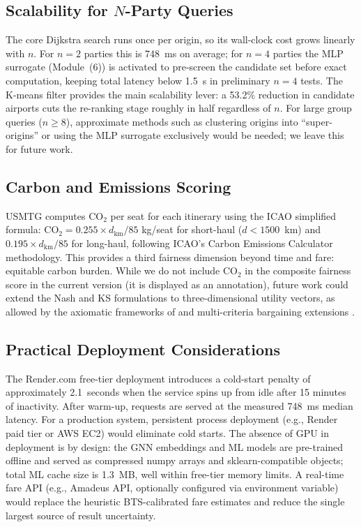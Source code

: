 \documentclass[review]{elsarticle}
\begin{document}
\subsection{Scalability for $N$-Party Queries}

The core Dijkstra search runs once per origin, so its wall-clock cost grows linearly with $n$.
For $n=2$ parties this is 748~ms on average; for $n=4$ parties the MLP surrogate (Module~(6)) is activated to pre-screen the candidate set before exact computation, keeping total latency below 1.5~s in preliminary $n=4$ tests.
The K-means filter provides the main scalability lever: a 53.2\% reduction in candidate airports cuts the re-ranking stage roughly in half regardless of $n$.
For large group queries ($n \geq 8$), approximate methods such as clustering origins into ``super-origins'' or using the MLP surrogate exclusively would be needed; we leave this for future work.

\subsection{Carbon and Emissions Scoring}

USMTG computes CO$_2$ per seat for each itinerary using the ICAO simplified formula: $\text{CO}_2 = 0.255 \times d_{\text{km}} / 85$ kg/seat for short-haul ($d < 1500$~km) and $0.195 \times d_{\text{km}} / 85$ for long-haul, following ICAO's Carbon Emissions Calculator methodology.
This provides a third fairness dimension beyond time and fare: equitable carbon burden.
While we do not include CO$_2$ in the composite fairness score in the current version (it is displayed as an annotation), future work could extend the Nash and KS formulations to three-dimensional utility vectors, as allowed by the axiomatic frameworks of \citeauthor{kalai1975} \cite{kalai1975} and multi-criteria bargaining extensions \cite{deb2002}.

\subsection{Practical Deployment Considerations}

The Render.com free-tier deployment introduces a cold-start penalty of approximately 2.1~seconds when the service spins up from idle after 15 minutes of inactivity.
After warm-up, requests are served at the measured 748~ms median latency.
For a production system, persistent process deployment (e.g., Render paid tier or AWS EC2) would eliminate cold starts.
The absence of GPU in deployment is by design: the GNN embeddings and ML models are pre-trained offline and served as compressed numpy arrays and sklearn-compatible objects; total ML cache size is 1.3~MB, well within free-tier memory limits.
A real-time fare API (e.g., Amadeus API, optionally configured via environment variable) would replace the heuristic BTS-calibrated fare estimates and reduce the single largest source of result uncertainty.
\end{document}
